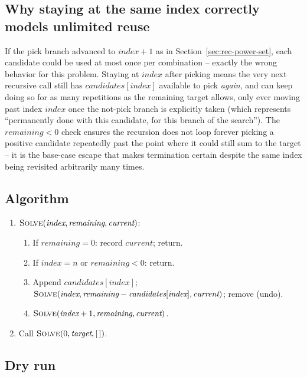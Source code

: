 \subsection*{Why staying at the same index correctly models unlimited reuse}

If the pick branch advanced to $\textit{index}+1$ as in
Section~\ref{sec:rec-power-set}, each candidate could be used at most
once per combination -- exactly the wrong behavior for this problem.
Staying at $\textit{index}$ after picking means the very next recursive
call still has $\textit{candidates}[\textit{index}]$ available to pick
\emph{again}, and can keep doing so for as many repetitions as the
remaining target allows, only ever moving past index $\textit{index}$
once the not-pick branch is explicitly taken (which represents
``permanently done with this candidate, for this branch of the search'').
The $\textit{remaining}<0$ check ensures the recursion does not loop
forever picking a positive candidate repeatedly past the point where it
could still sum to the target -- it is the base-case escape that makes
termination certain despite the same index being revisited arbitrarily
many times.

\subsection*{Algorithm}

\begin{enumerate}
  \item $\textsc{Solve}(\textit{index}, \textit{remaining}, \textit{current})$:
  \begin{enumerate}
    \item If $\textit{remaining}=0$: record $\textit{current}$; return.
    \item If $\textit{index}=n$ or $\textit{remaining}<0$: return.
    \item Append $\textit{candidates}[\textit{index}]$;
          $\textsc{Solve}(\textit{index}, \textit{remaining} -
          \textit{candidates}[\textit{index}], \textit{current})$;
          remove (undo).
    \item $\textsc{Solve}(\textit{index}+1, \textit{remaining},
          \textit{current})$.
  \end{enumerate}
  \item Call $\textsc{Solve}(0, \textit{target}, [\,])$.
\end{enumerate}

\subsection*{Dry run}

